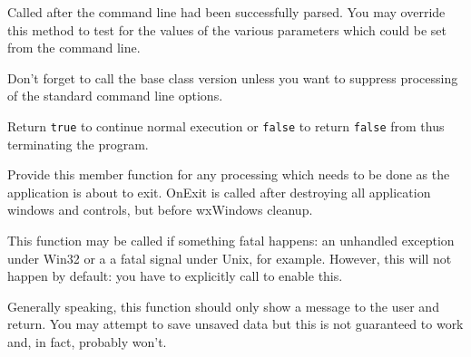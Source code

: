 


\label{wxapponcmdlineparsed}


Called after the command line had been successfully parsed. You may override
this method to test for the values of the various parameters which could be
set from the command line.

Don't forget to call the base class version unless you want to suppress
processing of the standard command line options.

Return {\tt true} to continue normal execution or {\tt false} to return 
{\tt false} from  thus terminating the program.




\label{wxapponexit}


Provide this member function for any processing which needs to be
done as the application is about to exit. OnExit is called after
destroying all application windows and controls, but before
wxWindows cleanup.


\label{wxapponfatalexception}


This function may be called if something fatal happens: an unhandled
exception under Win32 or a a fatal signal under Unix, for example. However,
this will not happen by default: you have to explicitly call 
 to enable this.

Generally speaking, this function should only show a message to the user and
return. You may attempt to save unsaved data but this is not guaranteed to
work and, in fact, probably won't.



